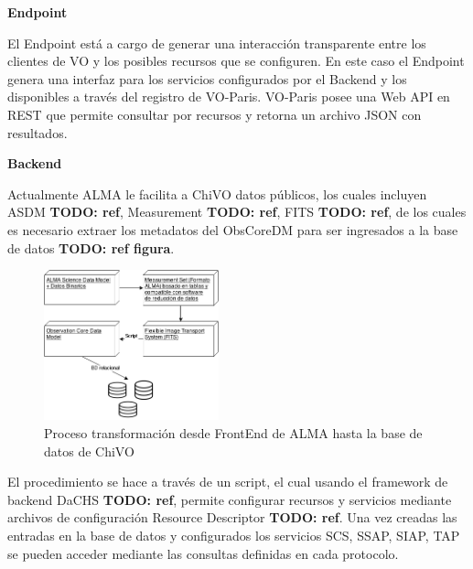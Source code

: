 \textbf{Endpoint}

El Endpoint está a cargo de generar una interacción transparente entre los clientes de VO y los posibles recursos que se configuren. En este caso el Endpoint genera una interfaz para los servicios configurados por el Backend y los disponibles a través del registro de VO-Paris. VO-Paris posee una Web API en REST que permite consultar por recursos y retorna un archivo JSON con resultados.

\textbf{Backend}

Actualmente ALMA le facilita a ChiVO datos públicos, los cuales incluyen ASDM \textbf{TODO: ref}, Measurement \textbf{TODO: ref}, FITS \textbf{TODO: ref}, de los cuales es necesario extraer los metadatos del ObsCoreDM para ser ingresados a la base de datos \textbf{TODO: ref figura}.

\begin{figure}[h]
    \centering
    \includegraphics[width=0.45\textwidth]{images/metadata.png}
    \caption{Proceso transformación desde FrontEnd de ALMA hasta la base de datos de ChiVO}
    \label{fig:metadata}
\end{figure}

El procedimiento se hace a través de un script, el cual usando el framework de backend DaCHS \textbf{TODO: ref}, permite configurar recursos y servicios mediante archivos de configuración Resource Descriptor \textbf{TODO: ref}. Una vez creadas las entradas en la base de datos y configurados los servicios SCS, SSAP, SIAP, TAP se pueden acceder mediante las consultas definidas en cada protocolo.




